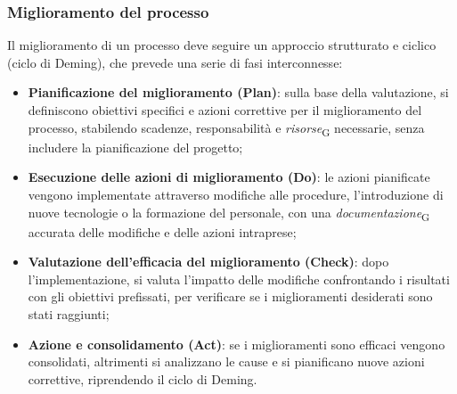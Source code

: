 \subsubsection{Miglioramento del processo}
Il miglioramento di un processo deve seguire un approccio strutturato e ciclico (ciclo di Deming), che prevede una serie di fasi interconnesse:
\begin{itemize}
    \item \textbf{Pianificazione del miglioramento (Plan)}: sulla base della valutazione, si definiscono obiettivi specifici e azioni correttive per il miglioramento del processo, stabilendo scadenze, responsabilità e \textit{risorse}\textsubscript{G} necessarie, senza includere la pianificazione del progetto;
    \item \textbf{Esecuzione delle azioni di miglioramento (Do)}: le azioni pianificate vengono implementate attraverso modifiche alle procedure, l'introduzione di nuove tecnologie o la formazione del personale, con una \textit{documentazione}\textsubscript{G} accurata delle modifiche e delle azioni intraprese;
    \item \textbf{Valutazione dell'efficacia del miglioramento (Check)}: dopo l'implementazione, si valuta l'impatto delle modifiche confrontando i risultati con gli obiettivi prefissati, per verificare se i miglioramenti desiderati sono stati raggiunti;
    \item \textbf{Azione e consolidamento (Act)}: se i miglioramenti sono efficaci vengono consolidati, altrimenti si analizzano le cause e si pianificano nuove azioni correttive, riprendendo il ciclo di Deming.
\end{itemize}